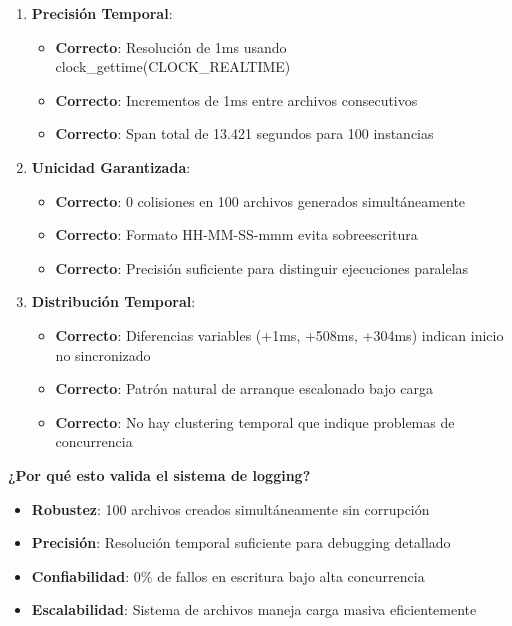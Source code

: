 \begin{enumerate}
    \item \textbf{Precisión Temporal}:
    \begin{itemize}
        \item \textcolor{successgreen}{\textbf{Correcto}}: Resolución de 1ms usando clock\_gettime(CLOCK\_REALTIME)
        \item \textcolor{successgreen}{\textbf{Correcto}}: Incrementos de 1ms entre archivos consecutivos
        \item \textcolor{successgreen}{\textbf{Correcto}}: Span total de 13.421 segundos para 100 instancias
    \end{itemize}
    
    \item \textbf{Unicidad Garantizada}:
    \begin{itemize}
        \item \textcolor{successgreen}{\textbf{Correcto}}: 0 colisiones en 100 archivos generados simultáneamente
        \item \textcolor{successgreen}{\textbf{Correcto}}: Formato HH-MM-SS-mmm evita sobreescritura
        \item \textcolor{successgreen}{\textbf{Correcto}}: Precisión suficiente para distinguir ejecuciones paralelas
    \end{itemize}
    
    \item \textbf{Distribución Temporal}:
    \begin{itemize}
        \item \textcolor{successgreen}{\textbf{Correcto}}: Diferencias variables (+1ms, +508ms, +304ms) indican inicio no sincronizado
        \item \textcolor{successgreen}{\textbf{Correcto}}: Patrón natural de arranque escalonado bajo carga
        \item \textcolor{successgreen}{\textbf{Correcto}}: No hay clustering temporal que indique problemas de concurrencia
    \end{itemize}
\end{enumerate}

\textbf{¿Por qué esto valida el sistema de logging?}
\begin{itemize}
    \item \textbf{Robustez}: 100 archivos creados simultáneamente sin corrupción
    \item \textbf{Precisión}: Resolución temporal suficiente para debugging detallado
    \item \textbf{Confiabilidad}: 0\% de fallos en escritura bajo alta concurrencia
    \item \textbf{Escalabilidad}: Sistema de archivos maneja carga masiva eficientemente
\end{itemize}

